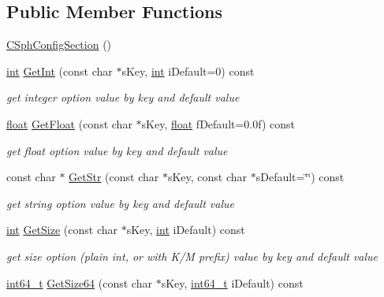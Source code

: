 \subsection*{Public Member Functions}
\begin{DoxyCompactItemize}
\item 
\hyperlink{classCSphConfigSection_ab9e07acc5a545ee092586106344a6cdd}{C\-Sph\-Config\-Section} ()
\item 
\hyperlink{sphinxexpr_8cpp_a4a26e8f9cb8b736e0c4cbf4d16de985e}{int} \hyperlink{classCSphConfigSection_ad704d0ca1fcd8fada808b5747ad2a165}{Get\-Int} (const char $\ast$s\-Key, \hyperlink{sphinxexpr_8cpp_a4a26e8f9cb8b736e0c4cbf4d16de985e}{int} i\-Default=0) const 
\begin{DoxyCompactList}\small\item\em get integer option value by key and default value \end{DoxyCompactList}\item 
\hyperlink{sphinxexpr_8cpp_a0e0d0739f7035f18f949c2db2c6759ec}{float} \hyperlink{classCSphConfigSection_a800c93734f4b6f25282055c02b1d8563}{Get\-Float} (const char $\ast$s\-Key, \hyperlink{sphinxexpr_8cpp_a0e0d0739f7035f18f949c2db2c6759ec}{float} f\-Default=0.\-0f) const 
\begin{DoxyCompactList}\small\item\em get float option value by key and default value \end{DoxyCompactList}\item 
const char $\ast$ \hyperlink{classCSphConfigSection_a18fa71434c9f5347bcc5f289eb90c8be}{Get\-Str} (const char $\ast$s\-Key, const char $\ast$s\-Default=\char`\"{}\char`\"{}) const 
\begin{DoxyCompactList}\small\item\em get string option value by key and default value \end{DoxyCompactList}\item 
\hyperlink{sphinxexpr_8cpp_a4a26e8f9cb8b736e0c4cbf4d16de985e}{int} \hyperlink{classCSphConfigSection_a4b3e6779c3145cf2a169acfab4737511}{Get\-Size} (const char $\ast$s\-Key, \hyperlink{sphinxexpr_8cpp_a4a26e8f9cb8b736e0c4cbf4d16de985e}{int} i\-Default) const 
\begin{DoxyCompactList}\small\item\em get size option (plain int, or with K/\-M prefix) value by key and default value \end{DoxyCompactList}\item 
\hyperlink{sphinxstd_8h_a996e72f71b11a5bb8b3b7b6936b1516d}{int64\-\_\-t} \hyperlink{classCSphConfigSection_a47891c72cf040e8ef4f03e661385e311}{Get\-Size64} (const char $\ast$s\-Key, \hyperlink{sphinxstd_8h_a996e72f71b11a5bb8b3b7b6936b1516d}{int64\-\_\-t} i\-Default) const 
\end{DoxyCompactItemize}
